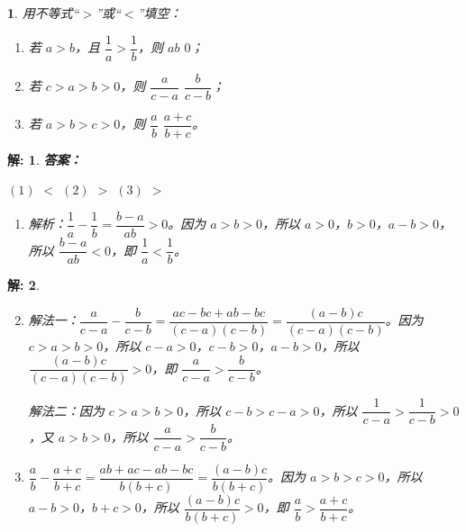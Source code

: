 \documentclass[aspectratio=169,13pt,fleqn,t] {beamer}
\newtheorem*{solve}{解:}
\newtheorem{Prob}{}
\begin{document}
\begin{frame}
	\begin{Prob}
		用不等式“$>$”或“$<$”填空：
		\begin{enumerate}[(1)]
		\item  若 $a>b$，且 $\dfrac{1}{a}>\dfrac{1}{b}$，则 $ab$ \underline{\hspace{2.5em}} $0$；
		
		\item  若 $c>a>b>0$，则 $\dfrac{a}{c-a}$ \underline{\hspace{2.5em}} $\dfrac{b}{c-b}$；
		
		\item  若 $a>b>c>0$，则 $\dfrac{a}{b}$ \underline{\hspace{2.5em}} $\dfrac{a+c}{b+c}$。
	\end{enumerate}
	\end{Prob}
	\vspace{-1em}
	\begin{solve}
		\textbf {答案：}
		
		$(1)$ $<$ \quad $(2)$ $>$ \quad $(3)$ $>$
		\begin{enumerate}[(1)]
			\item  解析：$\dfrac{1}{a}-\dfrac{1}{b}=\dfrac{b-a}{ab}>0$。因为 $a>b>0$，所以 $a>0$，$b>0$，$a-b>0$，所以 $\dfrac{b-a}{ab}<0$，即 $\dfrac{1}{a}<\dfrac{1}{b}$。
		\end{enumerate}
	\end{solve}
\end{frame}

\begin{frame}{}
	\begin{solve}
		\begin{enumerate}[(1)]
			\setcounter{enumi}{1}
			\item 解法一：$\dfrac{a}{c-a}-\dfrac{b}{c-b}=\dfrac{ac-bc+ab-bc}{(c-a)(c-b)}=\dfrac{(a-b)c}{(c-a)(c-b)}$。因为 $c>a>b>0$，所以 $c-a>0$，$c-b>0$，$a-b>0$，所以 $\dfrac{(a-b)c}{(c-a)(c-b)}>0$，即 $\dfrac{a}{c-a}>\dfrac{b}{c-b}$。
			
			解法二：因为 $c>a>b>0$，所以 $c-b>c-a>0$，所以 $\dfrac{1}{c-a}>\dfrac{1}{c-b}>0$，又 $a>b>0$，所以 $\dfrac{a}{c-a}>\dfrac{b}{c-b}$。
			\item $\dfrac{a}{b}-\dfrac{a+c}{b+c}=\dfrac{ab+ac-ab-bc}{b(b+c)}=\dfrac{(a-b)c}{b(b+c)}$。因为 $a>b>c>0$，所以 $a-b>0$，$b+c>0$，所以 $\dfrac{(a-b)c}{b(b+c)}>0$，即 $\dfrac{a}{b}>\dfrac{a+c}{b+c}$。
		\end{enumerate}
	\end{solve}
\end{frame}
\end{document}
